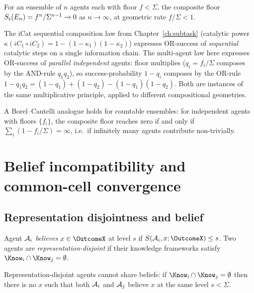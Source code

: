 \begin{corollary}\label{cor:asymptotic}
For an ensemble of $n$ agents each with floor $f<\Sigma$, the composite
floor $S_{\flat}(E_n)=f^n/\Sigma^{n-1}\to 0$ as $n\to\infty$, at geometric
rate $f/\Sigma<1$.
\end{corollary}

\begin{remark}\label{rem:seq-par}
The iCat sequential composition law from Chapter~\ref{ch:subtask}
(catalytic power $\kappa(iC_1\circ iC_2)=1-(1-\kappa_1)(1-\kappa_2)$)
expresses OR-success of \emph{sequential} catalytic steps on a single
information chain. The multi-agent law here expresses OR-success of
\emph{parallel independent} agents: floor multiplies ($q_i=f_i/\Sigma$
composes by the AND-rule $q_1q_2$), so success-probability
$1-q_i$ composes by the OR-rule $1-q_1q_2=(1-q_1)+(1-q_2)-(1-q_1)(1-q_2)$.
Both are instances of the same multiplicative principle, applied to
different compositional geometries.
\end{remark}

A Borel--Cantelli analogue holds for countable ensembles: for independent
agents with floors $\{f_i\}$, the composite floor reaches zero if and only if
$\sum_i(1-f_i/\Sigma)=\infty$, i.e.\ if infinitely many agents contribute
non-trivially.

\section{Belief incompatibility and common-cell convergence}
\label{sec:ch03-belief}

\subsection{Representation disjointness and belief}

\begin{definition}[Belief]\label{def:belief}
Agent $\mathcal{A}_i$ \emph{believes} $x\in\OutcomeX$ at level $s$ if
$S(\agent_i,x;\OutcomeX)\le s$. Two agents are
\emph{representation-disjoint} if their knowledge frameworks satisfy
$\Know_i\cap\Know_j=\emptyset$.
\end{definition}

\begin{theorem}\label{thm:belief-incompat}
Representation-disjoint agents cannot share beliefs: if
$\Know_i\cap\Know_j=\emptyset$ then there is no $x$ such that both
$\mathcal{A}_i$ and $\mathcal{A}_j$ believe $x$ at the same level $s<\Sigma$.
\end{theorem}

